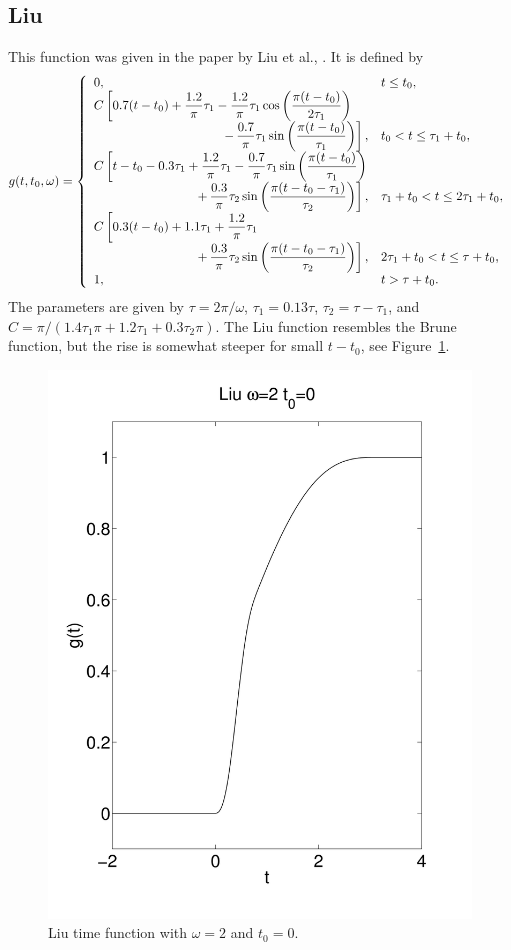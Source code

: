 \documentclass[11pt]{report}
\renewcommand{\arraystretch}{1.3}
\begin{document}
\subsection{Liu}
\renewcommand{\arraystretch}{1.5}
This function was given in the paper by Liu et al., \cite{liuetal_2006}. 
It is defined by 
\[
g(t,t_0,\omega) = \left\{ 
\begin{array}{ll}
  0, & t \leq t_0, \\
  C\left[0.7(t-t_0) + \dfrac{1.2}{\pi}\tau_1 - \dfrac{1.2}{\pi}\tau_1
  \cos\left(\dfrac{\pi (t-t_0)}{2\tau_1}\right) \right. & \\
     \hfill \left. -\,\dfrac{0.7}{\pi}\tau_1\sin\left(\dfrac{\pi (t-t_0)}{\tau_1}\right)\right],  & 
     t_0 < t \leq \tau_1+t_0, \\
%
  C\left[t-t_0-0.3\tau_1+\dfrac{1.2}{\pi}\tau_1-\dfrac{0.7}{\pi}\tau_1\sin\left(\dfrac{\pi
    (t-t_0)}{\tau_1}\right)\right. & \\ 
    \hfill
    \left. +\,\dfrac{0.3}{\pi}\tau_2\sin\left(\dfrac{\pi(t-t_0-\tau_1)}{\tau_2}\right)\right], &  
    \tau_1+t_0 < t \leq 2\tau_1+t_0, \\
%
  C\left[0.3(t-t_0)+1.1\tau_1+\dfrac{1.2}{\pi}\tau_1\right. & \\
    \hfill
    \left. +\,\dfrac{0.3}{\pi}\tau_2\sin\left(\dfrac{\pi(t-t_0-\tau_1)}{\tau_2}\right)\right], & 
    2\tau_1+t_0 < t \leq \tau+t_0, \\
  1,  &  t > \tau +t_0.
\end{array} \right.
\]
\noindent The parameters are given by $\tau=2\pi/\omega$, $\tau_1=0.13\tau$, $\tau_2 = \tau-\tau_1$,
and $C=\pi/(1.4\tau_1\pi+1.2\tau_1+0.3\tau_2\pi)$.  The Liu function resembles the Brune function,
but the rise is somewhat steeper for small $t-t_0$, see Figure~\ref{fig:liu}.
\begin{figure}
\begin{centering}
  \includegraphics[width=0.4\linewidth]{figures/f12-liu.png}
  \caption{Liu time function with $\omega=2$ and $t_0=0$.}
  \label{fig:liu}
\end{centering}
\end{figure}  
\end{document}
